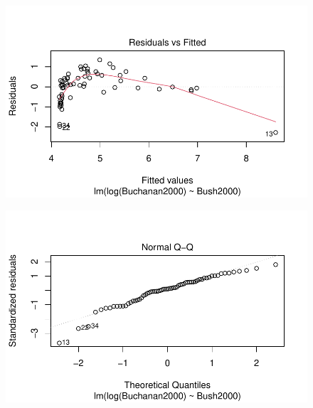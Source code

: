 \documentclass[
  letterpaper,
  DIV=11,
  numbers=noendperiod]{scrartcl}
\begin{document}
\begin{figure}[H]

{\centering \includegraphics{case_study_1_files/figure-pdf/unnamed-chunk-6-10.pdf}

}

\end{figure}

\begin{figure}[H]

{\centering \includegraphics{case_study_1_files/figure-pdf/unnamed-chunk-6-11.pdf}

}

\end{figure}
\end{document}
